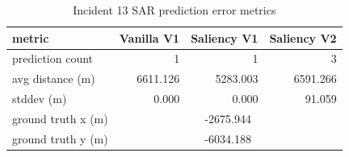 \begin{table}[ht]
\centering
\caption{Incident 13 SAR prediction error metrics}
\label{tab:sar-incident-13}
\begin{tabular}{lrrr}
\hline
metric & Vanilla V1 & Saliency V1 & Saliency V2 \\
\hline
prediction count & 1 & 1 & 3 \\
avg distance (m) & 6611.126 & 5283.003 & 6591.266 \\
stddev (m) & 0.000 & 0.000 & 91.059 \\
ground truth x (m) & \multicolumn{3}{c}{-2675.944} \\
ground truth y (m) & \multicolumn{3}{c}{-6034.188} \\
\hline
\end{tabular}
\end{table}
